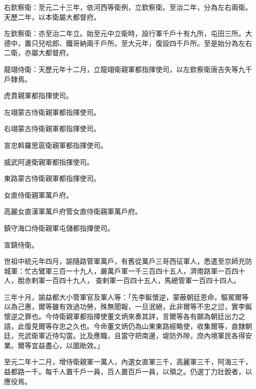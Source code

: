 \begin{pinyinscope}
 右欽察衛：至元二十三年，依河西等衛例，立欽察衛。至治二年，分為左右兩衛。天歷二年，以本衛屬大都督府。



 左欽察衛：亦至治二年立。始至元中立衛時，設行軍千戶十有九所，屯田三所。大德中，置只兒哈郎、鐵哥納兩千戶所。至大元年，復設四千戶所。至是始分為左右二衛，亦屬大都督府。



 龍翊侍衛：天歷元年十二月，立龍翊衛親軍都指揮使司，以左欽察衛唐吉失等九千戶隸焉。



 虎賁親軍都指揮使司。



 左翊蒙古侍衛親軍都指揮使司。



 右翊蒙古侍衛親軍都指揮使司。



 宣忠斡羅思扈衛親軍都指揮使司。



 威武阿速衛親軍都指揮使司。



 東路蒙古侍衛親軍都指揮使司。



 女直侍衛親軍萬戶府。



 高麗女直漢軍萬戶府管女直侍衛親軍萬戶府。



 鎮守海口侍衛親軍屯儲都指揮使司。



 宣鎮侍衛。



 世祖中統元年四月，諭隨路管軍萬戶，有舊從萬戶三哥西征軍人，悉遣至京師充防城軍：忙古鷿軍三百一十九人，嚴萬戶軍一千三百四十五人，濟南路軍一百四十人，脫赤剌軍一百四十九人，查剌軍一百四十五人，馬總管軍一百四十四人。



 三年十月，諭益都大小管軍官及軍人等：「先李鋋懷逆，蒙蔽朝廷恩命，驅駕爾等以為己惠，爾等雖有效過功勞，殊無聞報，一旦泯絕，此非爾等不忠之愆，實李鋋懷逆之罪也。今侍衛親軍都指揮使董文炳來奏其詳，言爾等各有願為朝廷出力之語，此復見爾等存忠之久也。今命董文炳仍為山東東路經略使，收集爾等，直隸朝廷，充武衛軍近侍勾當。比及應職，且當守把南邊，堤防外隙，庶內境軍民各得安業。爾等宜益盡心，以圖勛效。」



 至元二年十二月，增侍衛親軍一萬人，內選女直軍三千，高麗軍三千，阿海三千，益都路一千。每千人置千戶一員，百人置百戶一員，以領之。仍選丁力壯銳者，以應役焉。




\end{pinyinscope}
